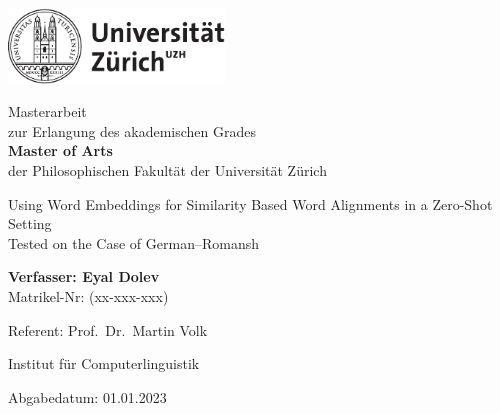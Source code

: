 \begin{titlepage}
\includegraphics[height=20mm]{graphics/uzh_logo_d_pos}\\

\begin{center}

{
Masterarbeit \\
zur Erlangung des akademischen Grades \\
\textbf{Master of Arts} \\
der Philosophischen Fakultät der Universität Zürich \\

\vspace{2cm}

{\Huge Using Word Embeddings for Similarity Based Word Alignments in a Zero-Shot Setting}\\
\vspace{0.5cm}
{\huge Tested on the Case of German--Romansh}\\

\vspace{4cm}

\textbf{Verfasser: Eyal Dolev} \\
	Matrikel-Nr: (xx-xxx-xxx) \\

\vspace{2cm}

Referent: Prof.~Dr.~Martin Volk


Institut für Computerlinguistik

\vfill Abgabedatum: 01.01.2023

\vspace{3cm}
}
\end{center}

\end{titlepage}

\newpage
